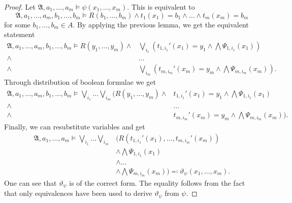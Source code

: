 \documentclass[a4paper,11pt,DIV=15]{scrartcl} %
\theoremstyle{plain}
\theoremstyle{definition}
\renewcommand{\theta}{\vartheta}
\begin{document}
\begin{proof}
	Let $\mathfrak A,a_1,\dots,a_m\models\psi(x_1,\dots,x_m)$.
	This is equivalent to 
	$$\mathfrak A,a_1,\dots,a_m,b_1,\dots,b_m\models R(b_1,\dots,b_m)\land t_1(x_1)=b_1\land\dots\land t_m(x_m)=b_m$$
	for some $b_1,\dots,b_m\in A$.
	By applying the previous lemma, we get the equivalent statement
	\begin{align*}
		\mathfrak A,a_1,\dots,a_m,b_1,\dots,b_m\models R(y_1,\dots,y_m) \land& \bigvee_{i_1}\left(t_{1,i_1}'(x_1)=y_1\land \bigwedge\Psi_{1,i_1}(x_1)\right) \\
		\land& \dots \\
		\land& \bigvee_{i_m}\left(t_{m,i_m}'(x_m)=y_m\land \bigwedge\Psi_{m,i_m}(x_m)\right).
	\end{align*}
	Through distribution of boolean formulae we get
	\begin{align}
		\mathfrak A,a_1,\dots,a_m,b_1,\dots,b_m\models \bigvee_{i_1} \dots \bigvee_{i_m} ( R(y_1,\dots,y_m)\land & t_{1,i_1}'(x_1)=y_1 \land \bigwedge\Psi_{1,i_1}(x_1) \nonumber \\
		\land & \dots \label{EquivalentDistributedAtomic}\\
		\land & t_{m,i_m}'(x_m)=y_m \land \bigwedge\Psi_{m,i_m}(x_m) ). \nonumber
	\end{align}
	Finally, we can resubstitute variables and get
	\begin{align*}
		\mathfrak A,a_1,\dots,a_m\models \bigvee_{i_1}\dots\bigvee_{i_m} &(R(t_{1,i_1}'(x_1),\dots,t_{m,i_m}'(x_m)) \\
		&\land \bigwedge\Psi_{1,i_1}(x_1) \\
		&\land\dots \\
		&\land\bigwedge\Psi_{m,i_m}(x_m))\eqqcolon \theta_\psi(x_1,\dots,x_m).
	\end{align*}
	One can see that $\theta_\psi$ is of the correct form.
	The equality follows from the fact that only equivalences have been used to derive $\theta_\psi$ from $\psi$.
	

\end{proof}
\end{document}
